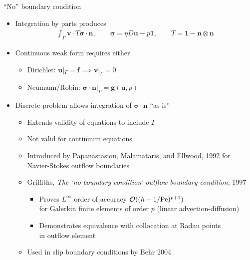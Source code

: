 \begin{frame}{``No'' boundary condition}
  \begin{itemize}
  \item Integration by parts produces
    \begin{gather*}
      \int_\Gamma \bm v \cdot T \bm\sigma \cdot \bm n, \qquad \bm\sigma = \eta D \bm u - p\bm 1, \qquad T = \bm 1 - \bm n \otimes \bm n
    \end{gather*}
  \item Continuous weak form requires either
    \begin{itemize}
    \item Dirichlet: $\bm u |_{\Gamma} = \bm f \implies \bm v|_\Gamma = 0$
    \item Neumann/Robin: $\bm\sigma\cdot\bm n |_\Gamma = \bm g(\bm u,p)$
    \end{itemize}
  \item Discrete problem allows integration of $\bm\sigma\cdot\bm n$ ``as is''
    \begin{itemize}
    \item Extends validity of equations to include $\Gamma$
    \item \alert{Not valid} for continuum equations
    \item Introduced by Papanastasiou, Malamataris, and Ellwood, 1992 for Navier-Stokes outflow boundaries
    \item Griffiths, {\small \emph{The `no boundary condition' outflow boundary condition}, 1997}
      \begin{itemize}
      \item Proves $L^\infty$ order of accuracy $\mathcal{O}((h + 1/{\mathrm{Pe}})^{p+1})$ \\
        for Galerkin finite elements of order $p$ (linear advection-diffusion)
      \item Demonstrates equivalence with collocation at Radau points \\ in outflow element
      \end{itemize}
    \item Used in slip boundary conditions by Behr 2004
    \end{itemize}
  \end{itemize}
\end{frame}
